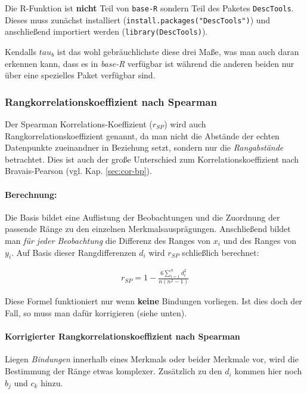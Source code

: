 \documentclass[a4paper]{article}
\newcommand\dangersign[1][2ex]{%
  \renewcommand\stacktype{L}%
  \scaleto{\stackon[1.3pt]{\color{red}$\triangle$}{\tiny !}}{#1}%
}
\begin{document}
\noindent \dangersign[3ex] Die R-Funktion ist \textbf{nicht} Teil von \texttt{base-R} sondern Teil des Paketes \texttt{DescTools}. Dieses muss zunächst installiert (\texttt{install.packages("DescTools")}) und anschließend importiert werden (\texttt{library(DescTools)}).

\noindent \dangersign[3ex] Kendalls $tau_b$ ist das wohl gebräuchlichste diese drei Maße, was man auch daran erkennen kann, dass es in \textit{base-R} verfügbar ist während die anderen beiden nur über eine spezielles Paket verfügbar sind.

\subsubsection{Rangkorrelationskoeffizient nach Spearman}
Der Spearman Korrelations-Koeffizient ($r_{SP}$) wird auch Rangkorrelationskoeffizient genannt, da man nicht die Abstände der echten Datenpunkte zueinandner in Beziehung setzt, sondern nur die \textit{Rangabstände} betrachtet. Dies ist auch der große Unterschied zum Korrelationskoeffizient nach Bravais-Pearson (vgl. Kap. \ref{sec:cor-bp}).

\paragraph{Berechnung:} Die Basis bildet eine Auflistung der Beobachtungen und die Zuordnung der passende Ränge zu den einzelnen Merkmalsausprägungen. Anschließend bildet man \textit{für jeder Beobachtung} die Differenz des Ranges von $x_i$ und des Ranges von $y_i$. Auf Basis dieser Rangdifferenzen $d_i$ wird $r_{SP}$ schließlich berechnet:

\begin{align*}
    r_{SP}=1-\frac{6\sum_{i=1}^nd_i^2}{n(n^2-1)}
\end{align*}

\noindent \dangersign[3ex] Diese Formel funktioniert nur wenn \textbf{keine} Bindungen vorliegen. Ist dies doch der Fall, so muss man dafür korrigieren (siehe unten).

\paragraph{Korrigierter Rangkorrelationskoeffizient nach Spearman} Liegen \textit{Bindungen} innerhalb eines Merkmals oder beider Merkmale vor, wird die Bestimmung der Ränge etwas komplexer. Zusätzlich zu den $d_i$ kommen hier noch $b_j$ und $c_k$ hinzu.\\
\end{document}
